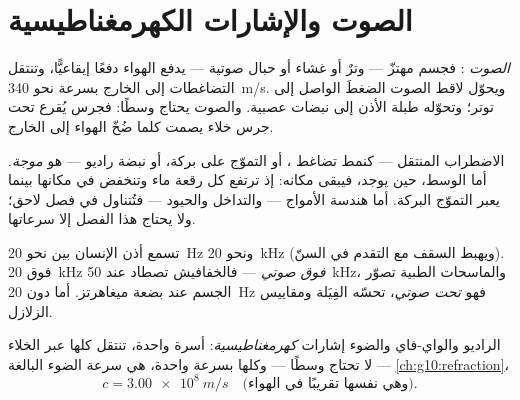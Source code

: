 \section{الصوت والإشارات الكهرمغناطيسية}

\begin{definition}[الصوت]\label{def:g10:signals-and-waves:sound}
\emph{الصوت}  : فجسم مهتزّ ---
وترٌ أو غشاء أو حبال صوتية --- يدفع الهواء دفعًا إيقاعيًّا، وتنتقل
التضاغطات إلى الخارج بسرعة نحو \qty{340}{m/s}. ويحوّل لاقط الصوت
الضغطَ الواصل إلى توتر؛ وتحوّله طبلة الأذن إلى نبضات
عصبية. والصوت يحتاج وسطًا: فجرس يُقرع تحت جرس خلاء يصمت
كلما ضُخّ الهواء إلى الخارج.
\end{definition}

\begin{definition}[الموجة]\label{def:g10:signals-and-waves:wave}
الاضطراب المنتقل --- كنمط تضاغط ، أو التموّج
على بركة، أو نبضة راديو --- هو \emph{موجة}. أما الوسط،
حين يوجد، فيبقى مكانه: إذ ترتفع كل رقعة ماء وتنخفض في مكانها بينما
يعبر التموّج البركة. أما هندسة الأمواج --- 
والتداخل والحيود --- فتُتناول في فصل لاحق؛ ولا يحتاج هذا
الفصل إلا سرعاتها.
\end{definition}

\begin{definition}\label{def:g10:signals-and-waves:ultrasound}
تسمع أذن الإنسان  بين نحو \qty{20}{Hz} ونحو \qty{20}{kHz}
(ويهبط السقف مع التقدم في السنّ).  فوق \qty{20}{kHz} 
\emph{فوق صوتي} --- فالخفافيش تصطاد عند \qty{50}{kHz}،
والماسحات الطبية تصوّر الجسم عند بضعة ميغاهرتز. أما  دون
\qty{20}{Hz} فهو \emph{تحت صوتي}، تحسّه الفِيَلة
ومقاييس الزلازل.
\end{definition}

\begin{proposition}\label{prop:g10:signals-and-waves:em}
الراديو والواي-فاي والضوء إشارات \emph{كهرمغناطيسية}: أسرة واحدة، تنتقل كلها
عبر الخلاء --- لا تحتاج وسطًا --- وكلها بسرعة واحدة، هي سرعة
الضوء البالغة \cref{ch:g10:refraction}،
\[
c = \qty{3.00e8}{m/s} \quad \text{(وهي نفسها تقريبًا في الهواء).}
\]
\end{proposition}
\admitted

